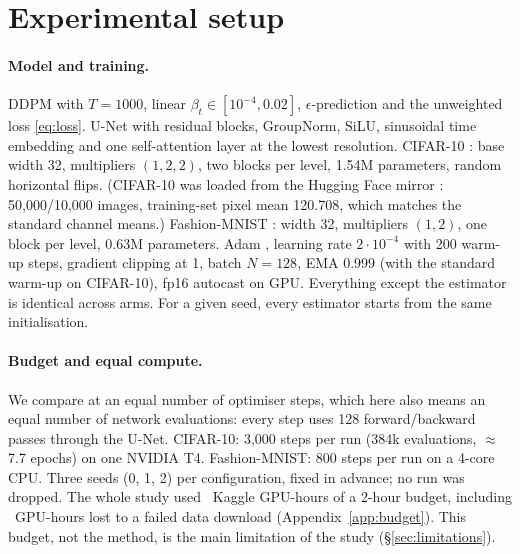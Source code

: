\section{Experimental setup}
\label{sec:setup}
\paragraph{Model and training.} DDPM with $T=1000$, linear $\beta_t\in[10^{-4},0.02]$, $\epsilon$-prediction and the
unweighted loss \eqref{eq:loss}. U-Net with residual blocks, GroupNorm, SiLU, sinusoidal time embedding and one
self-attention layer at the lowest resolution. CIFAR-10 \citep{krizhevsky2009}: base width 32, multipliers
$(1,2,2)$, two blocks per level, 1.54M parameters, random horizontal flips. (CIFAR-10 was loaded from the
Hugging Face mirror : 50,000/10,000 images, training-set pixel mean 120.708, which matches
the standard channel means.) Fashion-MNIST \citep{xiao2017fmnist}:
width 32, multipliers $(1,2)$, one block per level, 0.63M parameters. Adam \citep{kingma2015adam}, learning
rate $2\cdot10^{-4}$ with 200 warm-up steps, gradient clipping at 1, batch $N=128$, EMA 0.999 (with the standard
warm-up on CIFAR-10), fp16 autocast on GPU. Everything except the estimator is identical across arms. For a
given seed, every estimator starts from the same initialisation.

\paragraph{Budget and equal compute.} We compare at an equal number of optimiser steps, which here also means an
equal number of network evaluations: every step uses 128 forward/backward passes through the U-Net. CIFAR-10:
3,000 steps per run (384k evaluations, $\approx$7.7 epochs) on one NVIDIA T4. Fashion-MNIST: 800 steps per run on
a 4-core CPU. Three seeds (0, 1, 2) per configuration, fixed in advance; no run was dropped. The whole study
used \GPUhours\ Kaggle GPU-hours of a 2-hour budget, including \GPUhoursLost\ GPU-hours lost to a failed data
download (Appendix~\ref{app:budget}). This budget, not the method, is the main limitation of the study
(\S\ref{sec:limitations}).

